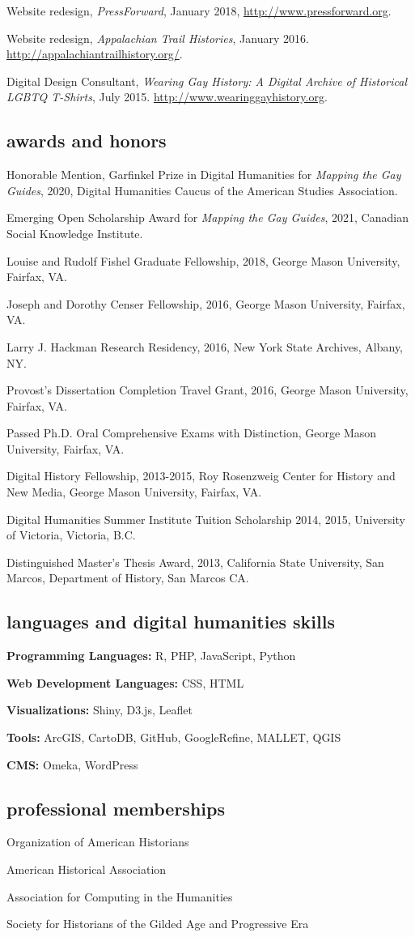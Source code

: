 \documentclass[11pt]{article}
\begin{document}
Website redesign, \emph{PressForward}, January 2018, \url{http://www.pressforward.org}.

Website redesign, \emph{Appalachian Trail Histories}, January 2016. \url{http://appalachiantrailhistory.org/}.

Digital Design Consultant, \emph{Wearing Gay History: A Digital Archive of Historical LGBTQ T-Shirts}, July 2015. \url{http://www.wearinggayhistory.org}.

\subsection{awards and honors}
Honorable Mention, Garfinkel Prize in Digital Humanities for \emph{Mapping the Gay Guides}, 2020, Digital Humanities Caucus of the American Studies Association.

Emerging Open Scholarship Award for \emph{Mapping the Gay Guides}, 2021, Canadian Social Knowledge Institute.

Louise and Rudolf Fishel Graduate Fellowship, 2018, George Mason University, Fairfax, VA.

Joseph and Dorothy Censer Fellowship, 2016, George Mason University, Fairfax, VA.

Larry J. Hackman Research Residency, 2016, New York State Archives, Albany, NY.

Provost's Dissertation Completion Travel Grant, 2016, George Mason University, Fairfax, VA.

Passed Ph.D. Oral Comprehensive Exams with Distinction, George Mason University, Fairfax, VA.

Digital History Fellowship, 2013-2015, Roy Rosenzweig Center for History and New Media, George Mason University, Fairfax, VA.

Digital Humanities Summer Institute Tuition Scholarship 2014, 2015, University of Victoria, Victoria, B.C.

Distinguished Master's Thesis Award, 2013, California State University, San Marcos, Department of History, San Marcos CA.


\subsection{languages and digital humanities skills}
\textbf{Programming Languages:} R, PHP, JavaScript, Python

\textbf{Web Development Languages:} CSS, HTML

\textbf{Visualizations:} Shiny, D3.js, Leaflet

\textbf{Tools:} ArcGIS, CartoDB, GitHub, GoogleRefine, MALLET, QGIS

\textbf{CMS:} Omeka, WordPress

\subsection{professional memberships}
Organization of American Historians

American Historical Association

Association for Computing in the Humanities

Society for Historians of the Gilded Age and Progressive Era
\end{document}
